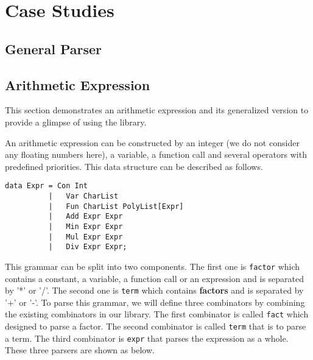 \chapter{Case Studies} \label{section:mparser}

\section{General Parser}

\section{Arithmetic Expression}
This section demonstrates an arithmetic expression and its generalized version to provide a glimpse of using the library.

An arithmetic expression can be constructed by an integer (we do not consider any floating numbers here), a variable, a function call and several operators with predefined priorities. This data structure can be described as follows.
\begin{lstlisting}
data Expr = Con Int
          |   Var CharList
          |   Fun CharList PolyList[Expr]
          |   Add Expr Expr
          |   Min Expr Expr
          |   Mul Expr Expr
          |   Div Expr Expr;
\end{lstlisting}
This grammar can be split into two components. The first one is \texttt{factor} which contains a constant, a variable, a function call or an expression and is separated by '*' or '/'.  The second one is \texttt{term} which contains \textbf{factors} and is separated by '+' or '-'.
To parse this grammar, we will define three combinators by combining the existing combinators in our library. The first combinator is called \texttt{fact} which designed to parse a factor. The second combinator is called \texttt{term} that is to parse a term. The third combinator is \texttt{expr} that parses the expression as a whole. These three parsers are shown as below.
